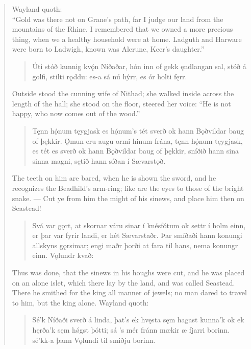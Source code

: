 \begin{verse}
\bvb Wayland quoth: \\
\bvb “Gold was there not on Grane’s path, far I judge our land from the mountains of the Rhine. I remembered that we owned a more precious thing, when we a healthy household were at home. Ladguth and Harware were born to Ladwigh, known was Alerune, Keer’s daughter.”

\begin{verse}
\bva Úti stóð kunnig \hld kvǫ́n Níðaðar,
hón inn of gekk \hld ęndlangan sal,
stóð á golfi, \hld stilti rǫddu:
es-a sá nú hýrr, \hld es ór holti fęrr. \\%
\end{verse}

\bvb Outside stood the cunning wife of Nithad; she walked inside across the length of the hall; she stood on the floor, steered her voice: “He is not happy, who now comes out of the wood.\footnotemark[1]”

\begin{verse}
\bva Tęnn hǫ́num tęygjask \hld es hǫ́num’s tét sverð
ok hann Bǫðvildar \hld baug of þękkir.
Ǫ́mun eru augu \hld ormi hinum frána,
tęnn hǫ́num tęygjask, \hld es tét es sverð
ok hann Bǫðvildar \hld baug of þękkir,
sníðið hann sina \hld sinna magni,
sętið hann síðan \hld í Sævarstǫð. \\%
\end{verse}

\bvb The teeth on him are bared, when he is shown the sword, and he recognizes the Beadhild’s arm-ring; like are the eyes to those of the bright snake. — Cut ye from him the might of his sinews, and place him then on Seastead!

\begin{verse}
\bva Svá var gǫrt, at skornar váru sinar í knésfótum ok settr í holm einn, er þar var fyrir landi, er hét Sævarstaðr. Þar smíðaði hann konungi allskyns gǫrsimar; engi maðr þorði at fara til hans, nema konungr einn. Vǫlundr kvað: \\%
\end{verse}

\bvb Thus was done, that the sinews in his houghs were cut, and he was placed on an alone islet, which there lay by the land, and was called Seastead. There he smithed for the king all manner of jewels; no man dared to travel to him, but the king alone. Wayland quoth: \\

\begin{verse}
\bva Sé’k Níðaði \hld sverð á linda,
þat’s ek hvęsta \hld sęm hagast kunna’k
ok ek hęrða’k \hld sęm hǿgst þótti;
sá ’s mér fránn mækir \hld æ fjarri borinn.
sé’kk-a þann Vǫlundi \hld til smiðju borinn. \\%
\end{verse}


\end{verse}
